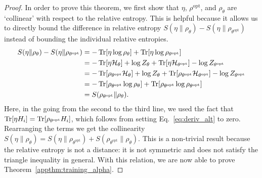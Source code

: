 \documentclass[
    reprint,
    aps,
    prx,
    longbibliography
]{revtex4-2}
\begin{document}
\begin{proof}
In order to prove this theorem, we first show that $\eta$, $\rho^\mathrm{opt}$, and $\rho_\theta$ are `collinear' with respect to the relative entropy. This is helpful because it allows us to directly bound the difference in relative entropy $ S(\eta \| \rho_{\theta}) - S(\eta \| \rho_{\theta^\mathrm{opt}})$ instead of bounding the individual relative entropies.
\begin{align}
\begin{split}
\label{eq:collinear}
    S(\eta \| \rho_{\theta}) - S(\eta \| \rho_{\theta^\mathrm{opt}})&= -\Tr[\eta \log \rho_\theta ] + \Tr[ \eta \log \rho_{\theta^\mathrm{opt}}] \\
    &= -\Tr[\eta \mathcal{H}_\theta] + \log Z_\theta + \Tr[\eta \mathcal{H}_{\theta^\mathrm{opt}}] - \log Z_{\theta^\mathrm{opt}} \\
    &= -\Tr[\rho_{\theta^\mathrm{opt}} \mathcal{H}_\theta] + \log Z_\theta + \Tr[\rho_{\theta^\mathrm{opt}} \mathcal{H}_{\theta^\mathrm{opt}}] - \log Z_{\theta^\mathrm{opt}} \\
    &= -\Tr[\rho_{\theta^\mathrm{opt}} \log \rho_{\theta} ] + \Tr[\rho_{\theta^\mathrm{opt}} \log \rho_{\theta^\mathrm{opt}} ]  \\
    &= S(\rho_{\theta^\mathrm{opt}} \| \rho_{\theta}) .
\end{split}
\end{align}
Here, in the going from the second to the third line, we used the fact that $\Tr[\eta H_i] = \Tr[\rho_{\theta^{\mathrm{opt}}} H_i]$, which follows from setting Eq.~\eqref{eq:deriv_alt} to zero. Rearranging the terms we get the collinearity $S(\eta \| \rho_{\theta}) = S(\eta \| \rho_{\theta^\mathrm{opt}}) + S(\rho_{\theta^\mathrm{opt}} \| \rho_{\theta})$.  
This is a non-trivial result because the relative entropy is not a distance: it is not symmetric and does not satisfy the triangle inequality in general. With this relation, we are now able to prove Theorem~\ref{appthm:training_alpha}. 


\end{proof}
\end{document}
